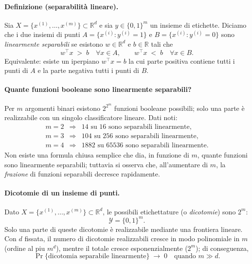 \paragraph{Definizione (separabilità lineare).}
Sia $X=\{x^{(1)},\ldots,x^{(m)}\}\subset\mathbb{R}^{d}$ e sia $y\in\{0,1\}^{m}$ un insieme di etichette.
Diciamo che i due insiemi di punti $A=\{x^{(i)}:y^{(i)}=1\}$ e $B=\{x^{(i)}:y^{(i)}=0\}$ sono \emph{linearmente separabili} se esistono $w\in\mathbb{R}^{d}$ e $b\in\mathbb{R}$ tali che
\[
w^\top x \;>\; b \quad \forall x\in A,
\qquad
w^\top x \;<\; b \quad \forall x\in B.
\]
Equivalente: esiste un iperpiano $w^\top x=b$ la cui parte positiva contiene tutti i punti di $A$ e la parte negativa tutti i punti di $B$.

\paragraph{Quante funzioni booleane sono linearmente separabili?}
Per $m$ argomenti binari esistono $2^{2^{m}}$ funzioni booleane possibili; solo una parte è realizzabile con un singolo classificatore lineare.
Dati noti:
\[
\begin{array}{lcl}
m=2 &\Rightarrow& 14 \text{ su } 16 \text{ sono separabili linearmente},\\[2pt]
m=3 &\Rightarrow& 104 \text{ su } 256 \text{ sono separabili linearmente},\\[2pt]
m=4 &\Rightarrow& 1882 \text{ su } 65536 \text{ sono separabili linearmente}.
\end{array}
\]
Non esiste una formula chiusa semplice che dia, in funzione di $m$, quante funzioni sono linearmente separabili; tuttavia si osserva che, all’aumentare di $m$, la \emph{frazione} di funzioni separabili decresce rapidamente.

\paragraph{Dicotomie di un insieme di punti.}
Dato $X=\{x^{(1)},\ldots,x^{(m)}\}\subset\mathbb{R}^{d}$, le possibili etichettature (o \emph{dicotomie}) sono $2^{m}$:
\[
\mathcal{Y}=\{0,1\}^{m} .
\]
Solo una parte di queste dicotomie è realizzabile mediante una frontiera lineare. Con $d$ fissata, il numero di dicotomie realizzabili cresce in modo polinomiale in $m$ (ordine al piu $m^{d}$), mentre il totale cresce esponenzialmente ($2^{m}$); di conseguenza,
\[
\Pr\{\text{dicotomia separabile linearmente}\}\;\longrightarrow\;0
\quad\text{quando } m \gg d .
\]

